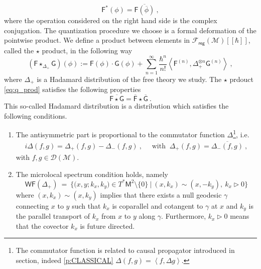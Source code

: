 \documentclass[11pt]{book}
\newcommand{\WF}{\mathsf{WF}}
\newcommand{\reg}{\mathsf{reg}}
\newcommand{\sm}[1]{\left\langle#1\right\rangle}
\newcommand{\Dcal}{\mathcal{D}}
\newcommand{\Fcal}{\mathcal{F}}
\newcommand{\Mcal}{\mathcal{M}}
\newcommand{\Fsf}{\mathsf{F}}
\newcommand{\Gsf}{\mathsf{G}}
\newcommand{\Msf}{\mathsf{M}}
\theoremstyle{break}
\begin{document}
\bigskip



\begin{equation*}
\Fsf^\ast(\phi) =  \overline{\Fsf(\overline{\phi})} \ ,
\end{equation*}
%
where the operation considered on the right hand side is the complex conjugation. The quantization procedure we choose is a formal deformation of the pointwise product. We define a product between elements in $\Fcal_\reg(\Mcal)[[\hbar]]$, called the $\star$ product, in the following way
%
\begin{equation}
(\Fsf \star_{\Delta_+} \Gsf)(\phi) := \Fsf(\phi) \cdot \Gsf(\phi) + \sum_{n=1}^\infty \frac{\hbar^n}{n!} \sm{ \Fsf^{(n)} , \Delta_+^{\otimes n} \Gsf^{(n) } } \ ,
\label{eq:q_prod}
\end{equation}
%
where $\Delta_+$ is a Hadamard distribution of the free theory we study. The $\star$ prdouct \eqref{eq:q_prod} satisfies the following properties
%
\begin{equation*}
\overline{\Fsf \star \Gsf} = \overline{\Fsf} \star \overline{\Gsf} \ .
\end{equation*}
%
This so-called Hadamard distribution is a distribution which satisfies the following conditions.
%
\begin{enumerate}
\item The antisymmetric part is proportional to the commutator function $\Delta$\footnote{The commutator function is related to causal propagator introduced in section, indeed \ref{p:CLASSICAL} $\Delta(f,g)=\sm{f,\Delta g}$.}, i.e. 
%
\begin{eqnarray*}
i \Delta(f,g) = \Delta_+(f,g) - \Delta_-(f,g) \ , \quad \mbox{ with } \ \Delta_+(f,g) = \overline{\Delta_-(f,g)} \ ,
\end{eqnarray*}
%
with $f,g \in \Dcal(\Mcal)$.

\item The microlocal spectrum condition holds, namely
%
\begin{equation}
\WF(\Delta_+) \ = \ \bigg\{ \bigg( x, y ; k_x, k_y \bigg) \in T^\ast\Msf^2 \setminus \{0\} \ \bigg| \ (x,k_x) \sim (x,-k_y), \ k_x \triangleright 0 \bigg\} 
\label{eq:wf_hadamard}
\end{equation}
%
where $(x,k_x) \sim (x,k_y)$ implies that there exists a null geodesic $\gamma$ connecting $x$ to $y$ such that $k_x$ is coparallel and cotangent to $\gamma$ at $x$ and $k_y$ is the parallel transport of $k_x$ from $x$ to $y$ along $\gamma$. Furthermore, $k_x \triangleright 0$ means that the covector $k_x$ is future directed.
\end{enumerate}
\end{document}
